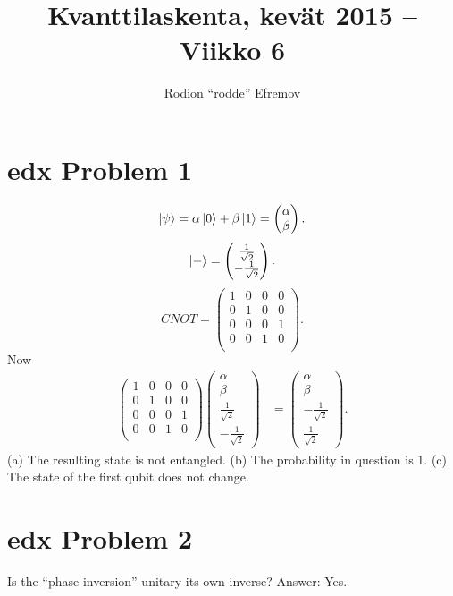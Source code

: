 \documentclass[10pt]{article}
\title{Kvanttilaskenta, kevät 2015 -- Viikko 6}
\author{Rodion ``rodde'' Efremov}
\begin{document}
 \maketitle
 
 \section*{edx Problem 1}
 \[
 \ket{\psi} = \alpha \ket{0} + \beta \ket{1} 
 = 
 \begin{pmatrix}
 \alpha \\
 \beta
 \end{pmatrix}.
 \]
 \[
 \ket{-} = 
 \begin{pmatrix}
\frac{1}{\sqrt{2}} \\
-\frac{1}{\sqrt{2}} 
 \end{pmatrix}.
 \]
\[
CNOT = 
\begin{pmatrix}
1 & 0 & 0 & 0 \\
0 & 1 & 0 & 0 \\
0 & 0 & 0 & 1 \\
0 & 0 & 1 & 0 \\
\end{pmatrix}.
\]
Now
\begin{align*}
\begin{pmatrix}
1 & 0 & 0 & 0 \\
0 & 1 & 0 & 0 \\
0 & 0 & 0 & 1 \\
0 & 0 & 1 & 0 \\
\end{pmatrix}
\begin{pmatrix}
\alpha \\ \beta \\ \frac{1}{\sqrt{2}} \\ -\frac{1}{\sqrt{2}}
\end{pmatrix} 
&= 
\begin{pmatrix}
\alpha \\
\beta \\
-\frac{1}{\sqrt{2}} \\
\frac{1}{\sqrt{2}}
\end{pmatrix}.
\end{align*}
(a) The resulting state is not entangled. (b) The probability in question is 1. (c) The state of the first qubit does not change.

\section*{edx Problem 2}
Is the ``phase inversion'' unitary its own inverse? Answer: Yes.
\end{document}
